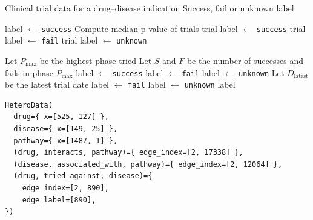 \begin{algorithm}[H]
\caption{Drug--Disease Success Labeling}\label{alg:labeling}
\begin{algorithmic}%
\REQUIRE Clinical trial data for a drug--disease indication
\ENSURE Success, fail or unknown label

    \STATE label $\gets$ \texttt{success}
    \STATE Compute median p-value of trials
        \STATE trial label $\gets$ \texttt{success}
        \STATE trial label $\gets$ \texttt{fail}
    \ELSE
        \STATE trial label $\gets$ \texttt{unknown}
    \ENDIF

    \STATE Let $P_{\max}$ be the highest phase tried
    \STATE Let $S$ and $F$ be the number of successes and fails in phase $P_{\max}$
        \STATE label $\gets$ \texttt{success}
        \STATE label $\gets$ \texttt{fail}
    \ELSE
        \STATE label $\gets$ \texttt{unknown}
    \ENDIF
\ENDIF
{}
    \STATE Let $D_{\text{latest}}$ be the latest trial date
        \STATE label $\gets$ \texttt{fail}
    \ELSE
        \STATE label $\gets$ \texttt{unknown}
    \ENDIF
\ENDIF
\RETURN label
\end{algorithmic}
\end{algorithm}

\begin{lstlisting}[caption={HeteroData graph structure}, label={lst:heterodata}]
HeteroData(
  drug={ x=[525, 127] },
  disease={ x=[149, 25] },
  pathway={ x=[1487, 1] },
  (drug, interacts, pathway)={ edge_index=[2, 17338] },
  (disease, associated_with, pathway)={ edge_index=[2, 12064] },
  (drug, tried_against, disease)={
    edge_index=[2, 890],
    edge_label=[890],
})
\end{lstlisting}

